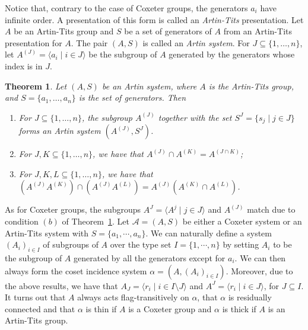 \documentclass[11pt,letterpaper]{amsart}
\newtheorem{thm}[prop]{Theorem}
\begin{document}
Notice that, contrary to the case of Coxeter groups, the generators $a_i$ have infinite order. A presentation of this form is called an \textit{Artin-Tits} presentation.
Let $A$ be an Artin-Tits group and $S$ be a set of generators of $A$ from an Artin-Tits presentation for $A$. The pair $(A,S)$ is called an \emph{Artin system}. For $J\subseteq \{1,\ldots,n\}$, let $A^{(J)}=\langle a_i\mid i\in J\rangle$ be the subgroup of $A$ generated by the generators whose index is in $J$.


    \begin{thm}\cite[Chapter II, Theorem 4.13]{van1983homotopy}\cite[Proposition 4.5]{ParisGodelle2012}\label{thm:ArtinProperties}
        Let $(A,S)$ be an Artin system, where $A$ is the Artin-Tits group, and $S=\{a_1,\ldots,a_n\}$ is the set of generators.
        Then
        \begin{enumerate}
            \item For $J\subseteq \{1,\ldots,n\}$, the subgroup $A^{(J)}$ together with the set $S^J=\{s_j\mid j\in J \}$
            forms an Artin system $(A^{(J)},S^J)$. %
            \item For $J,K\subseteq \{1,\ldots,n\}$, we have that $A^{(J)} \cap A^{(K)} =A^{(J\cap K)}$;
            \item For $J,K,L\subseteq \{1,\ldots,n\}$, we have that $(A^{(J)}A^{(K)})\cap (A^{(J)}A^{(L)})=A^{(J)}(A^{(K)}\cap A^{(L)})$.
        \end{enumerate}
    \end{thm} 

As for Coxeter groups, the subgroups $A^J = \langle A^j\mid j\in J\rangle$ and $A^{(J)}$ match due to condition $(b)$ of Theorem~\ref{thm:ArtinProperties}.
Let $\mathcal{A} = (A,S)$ be either a Coxeter system or an Artin-Tits system with $S = \{  a_1, \cdots, a_n \}$. We can naturally define a system $(A_i)_{i \in I}$ of subgroups of $A$ over the type set $I = \{1,\cdots,n\}$ by setting $A_i$ to be the subgroup of $A$ generated by all the generators except for $a_i$. We can then always form the coset incidence system $\alpha =(A,(A_i)_{i \in I})$. 
Moreover, due to the above results, we have that $A_J = \langle r_i \mid i\in I\setminus J \rangle$ and $A^J = \langle r_i\mid i\in J \rangle$, for $J\subseteq I$.
It turns out that $A$ always acts flag-transitively on $\alpha$, that $\alpha$ is residually connected and that $\alpha$ is thin if $A$ is a Coxeter group and $\alpha$ is thick if $A$ is an Artin-Tits group.
\end{document}
